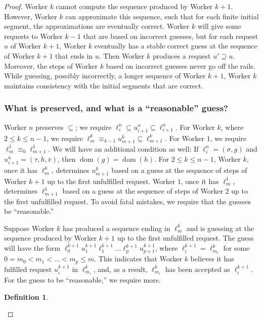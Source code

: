 \documentclass{article}
\DeclareMathOperator{\dom}{dom}
\theoremstyle{definition}
\newtheorem{defn}[thm]{Definition}
\begin{document}
\begin{proof}
		Worker $k$ cannot compute the sequence produced by Worker $k+1$. However, Worker $k$ can approximate this sequence, such that for each finite initial segment, the approximations are eventually correct. Worker $k$ will give some requests to Worker $k-1$ that are based on incorrect guesses, but for each request $u$ of Worker $k+1$, Worker $k$ eventually has a stable correct guess at the sequence of Worker $k+1$ that ends in $u$. Then Worker $k$ produces a request $u'\supseteq u$. Moreover, the steps of Worker $k$ based on incorrect guesses never go off the rails. While guessing, possibly incorrectly, a longer sequence of Worker $k+1$, Worker $k$ maintains consistency with the initial segments that are correct. 
		
		\subsubsection{What is preserved, and what is a ``reasonable'' guess?}
		
		Worker $n$ preserves $\subseteq$; we require $\ell^n_i\subseteq u^n_{i+1}\subseteq\ell^n_{i+1}$. For Worker $k$, where $2\leq k\leq n-1$, we require $\ell^k_m\equiv_{k-1}u^k_{m+1}\subseteq\ell^k_{m+1}$. For Worker $1$, we require $\ell^1_m\equiv_0\ell^1_{m+1}$. We will have an additional condition as well: If $\ell^n_i = (\sigma,g)$ and $u^n_{i+1} = (\tau,h,\bar{v})$, then $\dom(g) = \dom(h)$. For $2\leq k\leq n-1$, Worker $k$, once it has $\ell^k_m$, determines $u^k_{m+1}$ based on a guess at the sequence of steps of Worker $k+1$ up to the first unfulfilled request. Worker $1$, once it has $\ell^1_m$, determines $\ell^1_{m+1}$ based on a guess at the sequence of steps of Worker $2$ up to the first unfulfilled request. To avoid fatal mistakes, we require that the guesses be ``reasonable.'' 
		
		Suppose Worker $k$ has produced a sequence ending in $\ell^k_m$ and is guessing at the sequence produced by Worker $k+1$ up to the first unfulfilled request. The guess will have the form $\ell^{k+1}_0u^{k+1}_1\ell^{k+1}_1\ldots\ell^{k+1}_p u^{k+1}_{p+1}$, where $\ell^{k+1}_i = \ell^k_{m_i}$ for some $0 = m_0 < m_1 < \ldots < m_p\leq m$. This indicates that Worker $k$ believes it has fulfilled request $u^{k+1}_i$ in $\ell^k_{m_i}$, and, as a result, $\ell^k_{m_i}$ has been accepted as $\ell^{k+1}_i$.  For the guess to be ``reasonable,'' we require more.
		
		\begin{defn}\ 
			
			\begin{enumerate}
				

\end{enumerate}
\end{defn}
\end{proof}
\end{document}
